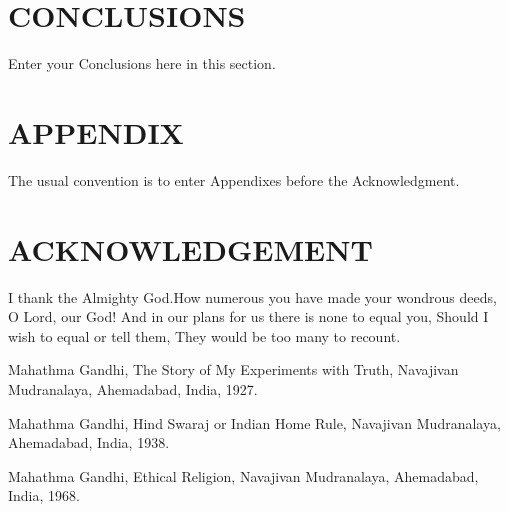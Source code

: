 \documentclass[a4paper, 10pt, conference]{ieeeconf}      %
\begin{document}


\section{CONCLUSIONS}

Enter your Conclusions here in this section. 

\addtolength{\textheight}{-12cm}   


\section*{APPENDIX}

The usual convention is to enter Appendixes before the Acknowledgment.


\section*{ACKNOWLEDGEMENT}



I thank the Almighty God.How numerous you have made your wondrous deeds,
O Lord, our God! And in our plans for us there is none to equal you,
Should I wish to equal or tell them,
They would be too many to recount.



\begin{thebibliography}{99}

 Mahathma Gandhi, The Story of My Experiments with Truth, Navajivan Mudranalaya,   
Ahemadabad, India, 1927.

 Mahathma Gandhi, Hind Swaraj or Indian Home Rule, Navajivan Mudranalaya,   
Ahemadabad, India, 1938.

  Mahathma Gandhi, Ethical Religion, Navajivan Mudranalaya,   
Ahemadabad, India, 1968.
 

\end{thebibliography}
\end{document}
